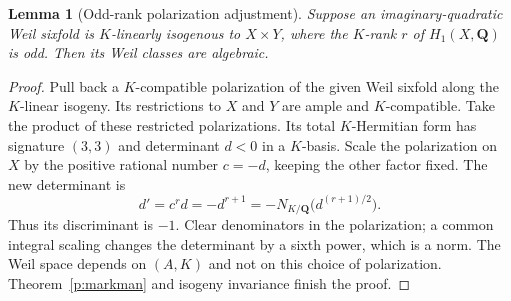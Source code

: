 \documentclass[11pt,reqno]{article}
\theoremstyle{emphasizedplain}
\theoremstyle{emphasizeddefinition}
\theoremstyle{emphasizeddefinition}
\newtheorem{prelemma}{Lemma}
\newcommand{\Q}{\mathbf Q}
\begin{document}
\begin{prelemma}[Odd-rank polarization adjustment]
\label{p:oddscale}
Suppose an imaginary-quadratic Weil sixfold is $K$-linearly isogenous to
$X\times Y$, where the $K$-rank $r$ of $H_1(X,\Q)$ is odd.
Then its Weil classes are algebraic.
\end{prelemma}
\begin{proof}
Pull back a $K$-compatible polarization of the given Weil sixfold
along the $K$-linear isogeny. Its restrictions to $X$ and $Y$ are ample
and $K$-compatible. Take the product of these restricted polarizations. Its total $K$-Hermitian form has
signature $(3,3)$ and determinant $d<0$ in a $K$-basis. Scale the
polarization on $X$ by the positive rational number $c=-d$, keeping the
other factor fixed. The new determinant is
\[
 d'=c^r d=-d^{r+1}
     =-N_{K/\Q}\bigl(d^{(r+1)/2}\bigr).
\]
Thus its discriminant is $-1$. Clear denominators in the polarization;
a common integral scaling changes the determinant by a sixth power,
which is a norm. The Weil space depends on $(A,K)$ and not on this choice
of polarization. Theorem~\ref{p:markman} and isogeny invariance finish
the proof.
\end{proof}
\end{document}
